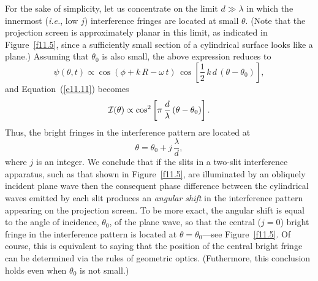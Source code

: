 For the sake of simplicity, let us concentrate on the limit  $d\gg \lambda$ in which the innermost ({\em i.e.},  low $j$) interference
fringes are located at small $\theta$. (Note that the projection screen is approximately  planar in this limit, as
indicated in Figure~\ref{f11.5}, since a sufficiently small section of a cylindrical surface looks like a plane.) Assuming that $\theta_0$ is also small, the above expression reduces to
\begin{equation}\label{e11.16}
\psi(\theta,t)\propto  \cos(\phi+ k\,R-\omega\,t)\,\cos
\left[\frac{1}{2}\,k\,d\,(\theta-\theta_0)\right],
\end{equation}
and Equation~(\ref{e11.11}) becomes
\begin{equation}
{\cal I}(\theta) \propto\cos^2\left[\pi\,\frac{d}{\lambda}\,(\theta-\theta_0)\right].
\end{equation}
Thus, the bright fringes in the interference pattern are located at 
\begin{equation}
\theta = \theta_0 + j\,\frac{\lambda}{d},
\end{equation}
 where $j$ is an integer.  We conclude  that if the slits 
in a two-slit interference apparatus, such as that shown in Figure~\ref{f11.5}, are illuminated by an obliquely incident plane wave then the consequent phase difference between the
cylindrical waves emitted by each slit produces an {\em angular shift}\/ in the interference pattern appearing on the projection screen. 
To be more exact, the angular shift is equal to the angle of incidence, $\theta_0$, of the plane wave, so that the central ($j=0$)
bright fringe in the interference pattern is located at $\theta=\theta_0$---see Figure~\ref{f11.5}. Of course, this is equivalent to saying that the
position of the central bright fringe can be determined via the rules of geometric optics. (Futhermore, this conclusion holds
even when $\theta_0$ is not small.)

